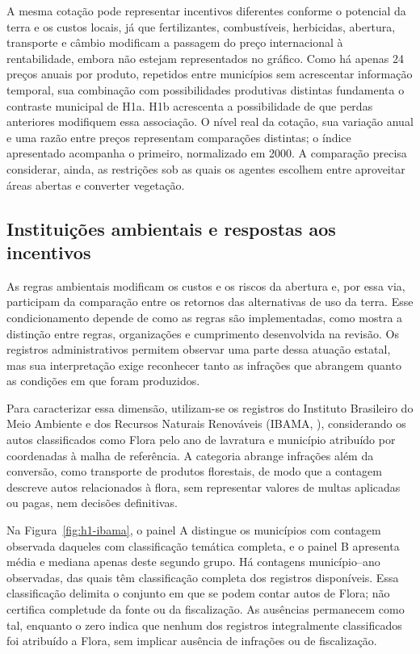 A mesma cotação pode representar incentivos diferentes conforme o potencial da terra e os custos locais, já que fertilizantes, combustíveis, herbicidas, abertura, transporte e câmbio modificam a passagem do preço internacional à rentabilidade, embora não estejam representados no gráfico. Como há apenas 24 preços anuais por produto, repetidos entre municípios sem acrescentar informação temporal, sua combinação com possibilidades produtivas distintas fundamenta o contraste municipal de H1a. H1b acrescenta a possibilidade de que perdas anteriores modifiquem essa associação. O nível real da cotação, sua variação anual e uma razão entre preços representam comparações distintas; o índice apresentado acompanha o primeiro, normalizado em 2000. A comparação precisa considerar, ainda, as restrições sob as quais os agentes escolhem entre aproveitar áreas abertas e converter vegetação.

\FloatBarrier
\subsection{Instituições ambientais e respostas aos incentivos}
\label{descritiva-instituicoes}

As regras ambientais modificam os custos e os riscos da abertura e, por essa via, participam da comparação entre os retornos das alternativas de uso da terra. Esse condicionamento depende de como as regras são implementadas, como mostra a distinção entre regras, organizações e cumprimento desenvolvida na revisão. Os registros administrativos permitem observar uma parte dessa atuação estatal, mas sua interpretação exige reconhecer tanto as infrações que abrangem quanto as condições em que foram produzidos.

Para caracterizar essa dimensão, utilizam-se os registros do Instituto Brasileiro do Meio Ambiente e dos Recursos Naturais Renováveis (IBAMA, \citeyear{IBAMA2026}), considerando os autos classificados como Flora pelo ano de lavratura e município atribuído por coordenadas à malha de referência. A categoria abrange infrações além da conversão, como transporte de produtos florestais, de modo que a contagem descreve autos relacionados à flora, sem representar valores de multas aplicadas ou pagas, nem decisões definitivas.

Na Figura~\ref{fig:h1-ibama}, o painel A distingue os municípios com contagem observada daqueles com classificação temática completa, e o painel B apresenta média e mediana apenas deste segundo grupo. Há \HibValid{} contagens município--ano observadas, das quais \HibComplete{} têm classificação completa dos registros disponíveis. Essa classificação delimita o conjunto em que se podem contar autos de Flora; não certifica completude da fonte ou da fiscalização. As ausências permanecem como tal, enquanto o zero indica que nenhum dos registros integralmente classificados foi atribuído a Flora, sem implicar ausência de infrações ou de fiscalização.

